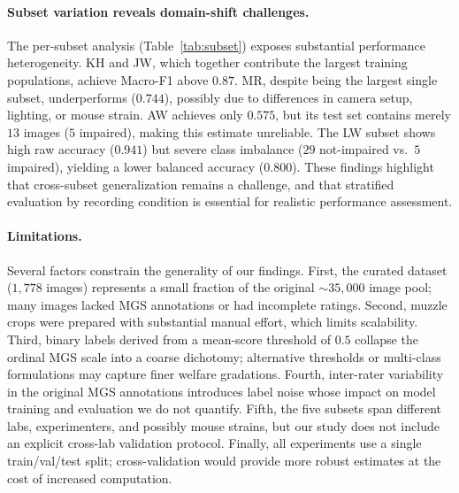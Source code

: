 \documentclass[sigconf]{acmart}
\begin{document}
\paragraph{Subset variation reveals domain-shift challenges.}
The per-subset analysis (Table~\ref{tab:subset}) exposes substantial
performance heterogeneity. KH and JW, which together contribute the largest
training populations, achieve Macro-F1 above $0.87$. MR, despite being the
largest single subset, underperforms ($0.744$), possibly due to differences in
camera setup, lighting, or mouse strain. AW achieves only $0.575$, but its
test set contains merely $13$ images ($5$ impaired), making this estimate
unreliable. The LW subset shows high raw accuracy ($0.941$) but severe class
imbalance ($29$ not-impaired vs.\ $5$ impaired), yielding a lower balanced
accuracy ($0.800$). These findings highlight that cross-subset generalization
remains a challenge, and that stratified evaluation by recording condition is
essential for realistic performance assessment.

\paragraph{Limitations.}
Several factors constrain the generality of our findings. First, the curated
dataset ($1{,}778$ images) represents a small fraction of the original
${\sim}35{,}000$ image pool; many images lacked MGS annotations or had
incomplete ratings. Second, muzzle crops were prepared with substantial manual
effort, which limits scalability. Third, binary labels derived from a
mean-score threshold of $0.5$ collapse the ordinal MGS scale into a coarse
dichotomy; alternative thresholds or multi-class formulations may capture
finer welfare gradations. Fourth, inter-rater variability in the original
MGS annotations introduces label noise whose impact on model training and
evaluation we do not quantify. Fifth, the five subsets span different labs,
experimenters, and possibly mouse strains, but our study does not include an
explicit cross-lab validation protocol. Finally, all experiments use a single
train/val/test split; cross-validation would provide more robust estimates
at the cost of increased computation.
\end{document}
